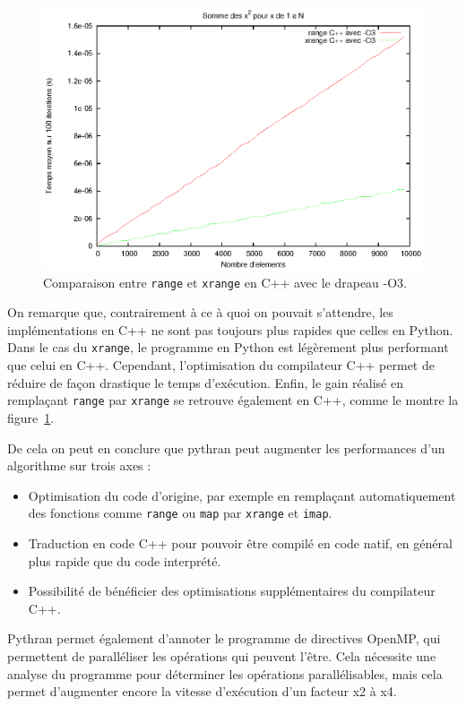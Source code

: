 \documentclass[a4paper]{article}
\begin{document}
\begin{figure}[h]
  \includegraphics[width=\textwidth]{./Pictures/RangeXrangeCppO3}
  \caption{Comparaison entre \texttt{range} et \texttt{xrange} en C++ avec le drapeau -O3.}
  \label{RangeXrangeCppO3}
\end{figure}

On remarque que, contrairement à ce à quoi on pouvait s'attendre, les
implémentations en C++ ne sont pas toujours plus rapides que celles en
Python. Dans le cas du \texttt{xrange}, le programme en Python est légèrement
plus performant que celui en C++. Cependant, l'optimisation du
compilateur C++ permet de réduire de façon drastique le temps
d'exécution. Enfin, le gain réalisé en remplaçant \texttt{range} par \texttt{xrange} se
retrouve également en C++, comme le montre la
figure~\ref{RangeXrangeCppO3}.

De cela on peut en conclure que pythran peut augmenter les
performances d'un algorithme sur trois axes :

\begin{itemize}
\item Optimisation du code d'origine, par exemple en remplaçant
  automatiquement des fonctions comme \texttt{range} ou \texttt{map} par \texttt{xrange} et \texttt{imap}.
\item Traduction en code C++ pour pouvoir être compilé en code natif,
  en général plus rapide que du code interprété.
\item Possibilité de bénéficier des optimisations supplémentaires du
  compilateur C++.
\end{itemize}


Pythran permet également d'annoter le programme de directives OpenMP,
qui permettent de paralléliser les opérations qui peuvent l'être. Cela
nécessite une analyse du programme pour déterminer les opérations
parallélisables, mais cela permet d'augmenter encore la vitesse
d'exécution d'un facteur x2 à x4\cite{PythranRenpar}.
\end{document}
